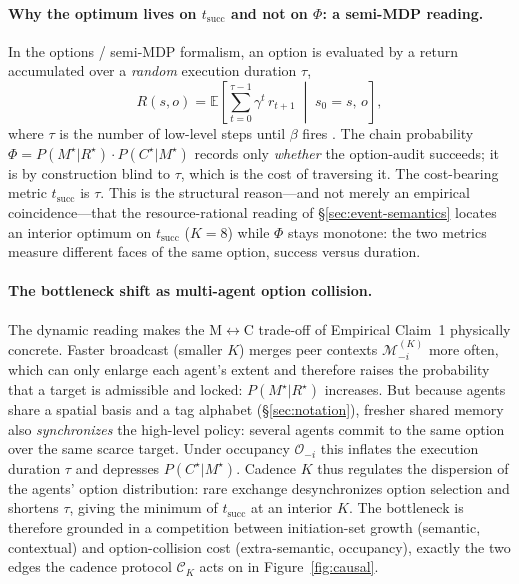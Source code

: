 \documentclass{article}
\begin{document}
\paragraph{Why the optimum lives on $t_{\mathrm{succ}}$ and not on $\Phi$: a semi-MDP reading.}
In the options / semi-MDP formalism, an option is evaluated by a
return accumulated over a \emph{random} execution duration $\tau$,
\[
R(s,o)=\mathbb{E}\!\left[\textstyle\sum_{t=0}^{\tau-1}\gamma^{t}\,r_{t+1}\;\middle|\;s_0=s,\,o\right],
\]
where $\tau$ is the number of low-level steps until $\beta$ fires
\citep{sutton1999between}. The chain probability
$\Phi=P(M^\star|R^\star)\!\cdot\!P(C^\star|M^\star)$ records only
\emph{whether} the option-audit succeeds; it is by construction blind to
$\tau$, which is the cost of traversing it. The cost-bearing metric
$t_{\mathrm{succ}}$ is $\tau$. This is the structural reason---and not
merely an empirical coincidence---that the resource-rational reading of
\S\ref{sec:event-semantics} \citep{lieder2020resource} locates an
interior optimum on $t_{\mathrm{succ}}$ ($K{=}8$) while $\Phi$ stays
monotone: the two metrics measure different faces of the same option,
success versus duration.

\paragraph{The bottleneck shift as multi-agent option collision.}
The dynamic reading makes the M$\leftrightarrow$C trade-off of
Empirical Claim~1 physically concrete. Faster broadcast (smaller $K$)
merges peer contexts $\mathcal{M}^{(K)}_{-i}$ more often, which can only
enlarge each agent's extent and therefore raises the probability that a
target is admissible and locked: $P(M^\star|R^\star)$ increases. But
because agents share a spatial basis and a tag alphabet
(\S\ref{sec:notation}), fresher shared memory also \emph{synchronizes}
the high-level policy: several agents commit to the same option over the
same scarce target. Under occupancy $\mathcal{O}_{-i}$ this inflates the
execution duration $\tau$ and depresses $P(C^\star|M^\star)$. Cadence
$K$ thus regulates the dispersion of the agents' option distribution:
rare exchange desynchronizes option selection and shortens $\tau$,
giving the minimum of $t_{\mathrm{succ}}$ at an interior $K$. The
bottleneck is therefore grounded in a competition between
initiation-set growth (semantic, contextual) and option-collision cost
(extra-semantic, occupancy), exactly the two edges the cadence protocol
$\mathcal{C}_K$ acts on in Figure~\ref{fig:causal}.
\end{document}
